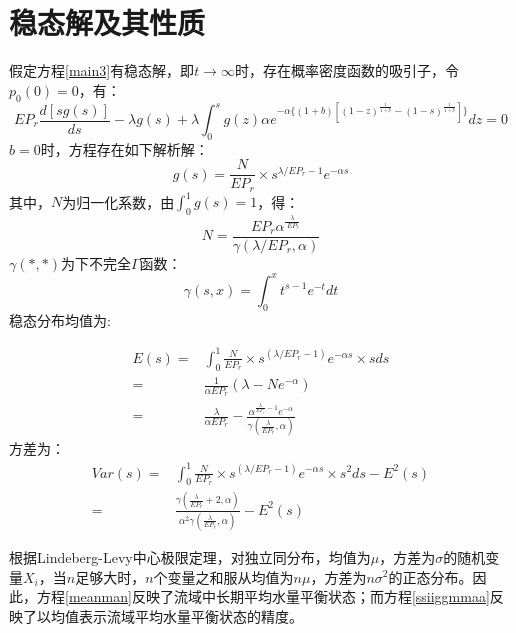 

 

\section{稳态解及其性质}
假定方程\ref{main3}有稳态解，即$t \to \infty$时，存在概率密度函数的吸引子，令$p_0(0)=0$，有：
\begin{equation} 
\label{main4}
EP_r\frac{d{[sg(s)]}}{d s}-\lambda g(s)+\lambda \int_{0}^{s} g(z)\alpha e^{-\alpha \{(1+b) [(1-z)^{\frac{1}{1+b}}-(1-s)^{\frac{1}{1+b}} ] \}}dz=0
\end{equation}
$b=0$时，方程存在如下解析解\cite{porporato2004soil}：
\begin{equation} 
\label{jxj}
g(s)=\frac{N}{EP_r} \times s^{\lambda / EP_r -1} e^{-\alpha s}
\end{equation}
其中，$N$为归一化系数，由$\int_{0}^{1} g(s)=1$，得：
\begin{equation} 
\label{normalizationfactor}
N=\frac{EP_r \alpha ^{\frac{\lambda} {\ EP_r}}}{\gamma (\lambda /EP_r , \alpha)}
\end{equation}
$\gamma(*,*)$为下不完全$\Gamma$函数：
\begin{equation}
\gamma(s,x)=\int_{0}^{x} t^{s-1}e^{-t}dt
\end{equation}
稳态分布均值为:
 
\begin{equation}
\label{meanman}
\begin{split}
E(s)=&\int_{0}^{1} \frac{N}{EP_r} \times s^{(\lambda / EP_r -1)} e^{-\alpha s} \times s ds\\
=&\frac{1}{\alpha EP_r}(\lambda-N e^{-\alpha})\\
=&\frac{\lambda}{\alpha EP_r}-\frac{\alpha^{\frac{\lambda}{EP_r}-1} e^{-\alpha}}{\gamma (\frac{\lambda}{EP_r},\alpha)}
\end{split}
\end{equation}
方差为：
\begin{equation} 
\label{ssiiggmmaa}
\begin{split}
Var(s)=&\int_{0}^{1} \frac{N}{EP_r} \times s^{(\lambda / EP_r -1)} e^{-\alpha s} \times s^2 ds-E^2(s)\\
=&\frac{\gamma (\frac{\lambda}{EP_r}+2,\alpha)}{\alpha ^2\gamma (\frac{\lambda}{EP_r},\alpha)}-E^2(s)
\end{split}
\end{equation}

根据Lindeberg-Levy中心极限定理，对独立同分布，均值为$\mu$，方差为$\sigma$的随机变量$X_i$，当$n$足够大时，$n$个变量之和服从均值为$n\mu$，方差为$n\sigma ^2$的正态分布。因此，方程\ref{meanman}反映了流域中长期平均水量平衡状态；而方程\ref{ssiiggmmaa}反映了以均值表示流域平均水量平衡状态的精度。

